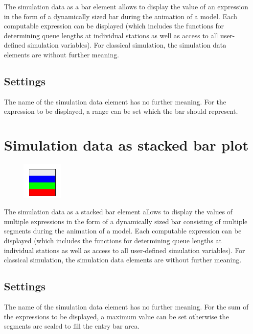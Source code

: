 The simulation data as a bar element allows to display the value of an expression in the form of a dynamically sized
bar during the animation of a model. Each computable expression can be displayed (which includes the functions for
determining queue lengths at individual stations as well as access to all user-defined simulation variables).
For classical simulation, the simulation data elements are without further meaning.

\subsection*{Settings}

The name of the simulation data element has no further meaning.
For the expression to be displayed, a range can be set which the bar should represent.


\section{Simulation data as stacked bar plot}
\label{ref:ModelElementAnimationBarStack}

\begin{figure}
\vspace{-22pt}
\includegraphics[width=2cm]{imageModelElementAnimationBarStack.png}
\vspace{-22pt}
\end{figure}

The simulation data as a stacked bar element allows to display the values of multiple expressions in the form of
a dynamically sized bar consisting of multiple segments during the animation of a model. Each computable expression
can be displayed (which includes the functions for determining queue lengths at individual stations as well as access
to all user-defined simulation variables). For classical simulation, the simulation data elements are without further meaning.

\subsection*{Settings}

The name of the simulation data element has no further meaning.
For the sum of the expressions to be displayed, a maximum value can be set 
otherwise the segments are scaled to fill the entry bar area.


